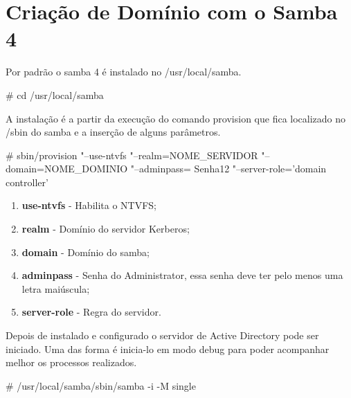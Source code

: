 \section{Criação de Domínio com o Samba 4}

Por padrão o samba 4 é instalado no /usr/local/samba.

\# cd /usr/local/samba

A instalação é a partir da execução do comando provision que fica localizado no /sbin do samba e a inserção de alguns parâmetros.

\# sbin/provision "--use-ntvfs "--realm=NOME\_SERVIDOR "--domain=NOME\_DOMINIO  "--adminpass= Senha12 "--server-role='domain controller'

\begin{enumerate}
	\item \textbf{use-ntvfs} - Habilita o NTVFS;
	\item \textbf{realm} - Domínio do servidor Kerberos;
	\item \textbf{domain} - Domínio do samba;
	\item \textbf{adminpass} - Senha do Administrator, essa senha deve ter pelo menos uma letra maiúscula;
	\item \textbf{server-role} - Regra do servidor.
\end{enumerate}

Depois de instalado e configurado o servidor de Active Directory pode ser iniciado. Uma das forma é inicia-lo em modo debug para poder acompanhar melhor os processos realizados.

\# /usr/local/samba/sbin/samba -i -M single

